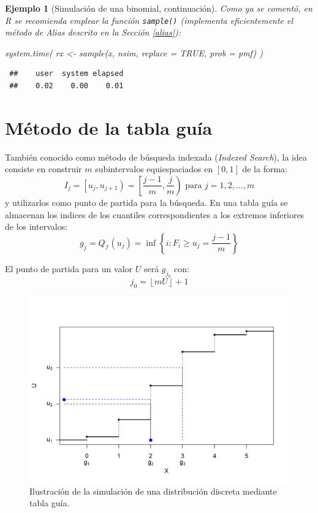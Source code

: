 \documentclass[
]{book}
\newenvironment{Shaded}{\begin{snugshade}}{\end{snugshade}}
\newcommand{\AttributeTok}[1]{\textcolor[rgb]{0.77,0.63,0.00}{#1}}
\newcommand{\ConstantTok}[1]{\textcolor[rgb]{0.00,0.00,0.00}{#1}}
\newcommand{\FunctionTok}[1]{\textcolor[rgb]{0.00,0.00,0.00}{#1}}
\newcommand{\NormalTok}[1]{#1}
\newcommand{\OtherTok}[1]{\textcolor[rgb]{0.56,0.35,0.01}{#1}}
\theoremstyle{break}
\newtheorem{example}{Ejemplo}[chapter]
\theoremstyle{nonumberplain}
\begin{document}
\begin{example}[Simulación de una binomial, continuación]
Como ya se comentó, en R se recomienda emplear la función \texttt{sample()}
(implementa eficientemente el método de Alias descrito en la Sección \ref{alias}):

\begin{Shaded}
\begin{Highlighting}[]
\FunctionTok{system.time}\NormalTok{( rx }\OtherTok{\textless{}{-}} \FunctionTok{sample}\NormalTok{(x, nsim, }\AttributeTok{replace =} \ConstantTok{TRUE}\NormalTok{, }\AttributeTok{prob =}\NormalTok{ pmf) )}
\end{Highlighting}
\end{Shaded}

\begin{verbatim}
 ##    user  system elapsed 
 ##    0.02    0.00    0.01
\end{verbatim}

\end{example}

\hypertarget{muxe9todo-de-la-tabla-guuxeda}{%
\section{Método de la tabla guía}\label{muxe9todo-de-la-tabla-guuxeda}}

También conocido como método de búsqueda indexada (\emph{Indexed Search}), la idea consiste en construir \(m\) subintervalos equiespaciados en \([0,1]\) de la forma:
\[I_{j}=\left[ u_{j},u_{j+1}\right) =\left[ \frac{j-1}{m},\frac{j}{m}\right) 
\text{ para }j=1,2,\ldots ,m\]
y utilizarlos como punto de partida para la búsqueda.
En una tabla guía se almacenan los indices de los cuantiles correspondientes a los extremos inferiores de los intervalos:
\[g_{j}=Q_{\mathcal{I}}(u_{j})=\inf \left\{ i:F_{i}\geq u_{j}=\frac{j-1}{m}\right\}\]

El punto de partida para un valor \(U\) será \(g_{j_{0}}\) con:
\[j_{0}=\left\lfloor mU\right\rfloor +1\]

\begin{figure}[!htb]

{\centering \includegraphics[width=0.8\linewidth]{images/tabla-sim} 

}

\caption{Ilustración de la simulación de una distribución discreta mediante tabla guía.}\label{fig:tabla-movie}
\end{figure}
\end{document}
